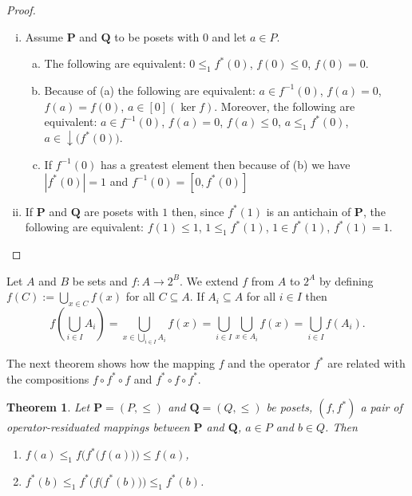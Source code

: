 \documentclass[12pt]{article}
\newtheorem{theorem}{Theorem}[section]
\begin{document}
\begin{proof}
$\text{}$ \\
\begin{enumerate}[(i)]
\item Assume $\mathbf P$ and $\mathbf Q$ to be posets with $0$ and let $a\in P$.
\begin{enumerate}[(a)]
\item The following are equivalent: $0\le_1f^*(0)$, $f(0)\le0$, $f(0)=0$.
\item Because of (a) the following are equivalent: $a\in f^{-1}(0)$, $f(a)=0$, $f(a)=f(0)$, $a\in [0](\ker f)$. Moreover, the following are equivalent: $a\in f^{-1}(0)$, $f(a)=0$, $f(a)\le0$, $a\le_1f^*(0)$, $a\in\downarrow\big(f^*(0)\big)$.
\item If $f^{-1}(0)$ has a greatest element then because of (b) we have $|f^*(0)|=1$ and $f^{-1}(0)=[0,f^*(0)]$
\end{enumerate}
\item If $\mathbf P$ and $\mathbf Q$ are posets with $1$ then, since $f^*(1)$ is an antichain of $\mathbf P$, the following are equivalent: $f(1)\le1$, $1\le_1f^*(1)$, $1\in f^*(1)$, $f^*(1)=1$.
\end{enumerate}
\end{proof}

Let $A$ and $B$ be sets and $f\colon A\to2^B$. We extend $f$ from $A$ to $2^A$ by defining $f(C):=\bigcup\limits_{x\in C}f(x)$ for all $C\subseteq A$. If $A_i\subseteq A$ for all $i\in I$ then
\[
f\left(\bigcup_{i\in I}A_i\right)=\bigcup_{x\in\bigcup\limits_{i\in I}A_i}f(x)=\bigcup_{i\in I}\bigcup_{x\in A_i}f(x)=\bigcup_{i\in I}f(A_i).
\]

The next theorem shows how the mapping $f$ and the operator $f^*$ are related with the compositions $f\circ f^*\circ f$ and $f^*\circ f\circ f^*$.

\begin{theorem}\label{th2}
Let $\mathbf P=(P,\le)$ and $\mathbf Q=(Q,\le)$ be posets, $(f,f^*)$ a pair of operator-residuated mappings between $\mathbf P$ and $\mathbf Q$, $a\in P$ and $b\in Q$. Then
\begin{enumerate}[{\rm(i)}]
\item $f(a)\le_1f\Big(f^*\big(f(a)\big)\Big)\le f(a)$,
\item $f^*(b)\le_1f^*\Big(f\big(f^*(b)\big)\Big)\le_1f^*(b)$.
\end{enumerate}
\end{theorem}
\end{document}
